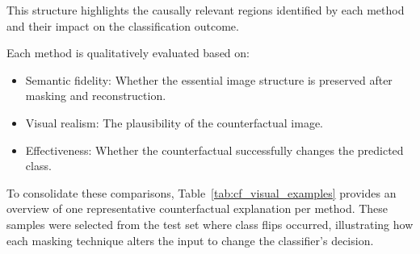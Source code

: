This structure highlights the causally relevant regions identified by each method and their impact on the classification outcome.

Each method is qualitatively evaluated based on:
\begin{itemize}
    \item Semantic fidelity: Whether the essential image structure is preserved after masking and reconstruction.
    \item Visual realism: The plausibility of the counterfactual image.
    \item Effectiveness: Whether the counterfactual successfully changes the predicted class.
\end{itemize}

\vspace{0.5em}

To consolidate these comparisons, Table~\ref{tab:cf_visual_examples} provides an overview of one representative counterfactual explanation per method. These samples were selected from the test set where class flips occurred, illustrating how each masking technique alters the input to change the classifier's decision.

